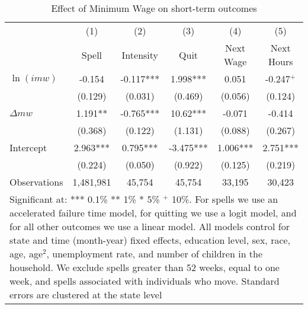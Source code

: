 \documentclass{article}
\begin{document}
\begin{table}
	\centering
	\caption{Effect of Minimum Wage on short-term outcomes}
	{
		\begin{tabular}{lccccc}
			&      (1) &  (2) &    (3) & (4)&(5)\\
			&      Spell &  Intensity &       Quit &  Next Wage & Next Hours \\
			\hline
			\hline
			$\ln(imw)$ &     -0.154 &  -0.117*** &   1.998*** &     0.051 &     -0.247$^+$ \\
			
			&    (0.129) &    (0.031) &    (0.469) &    (0.056) &    (0.124) \\
			
			$\Delta mw$ &    1.191** &  -0.765*** &   10.62*** &    -0.071 &     -0.414 \\
			
			&    (0.368) &    (0.122) &    (1.131) &    (0.088) &    (0.267) \\
			
			Intercept &   2.963*** &   0.795*** &  -3.475*** &   1.006*** &   2.751*** \\
			
			&    (0.224) &     (0.050) &    (0.922) &    (0.125) &    (0.219) \\\hdashline
			
			Observations &    1,481,981 &      45,754 &      45,754 &      33,195 &      30,423 \\
			\hline
			\multicolumn{6}{p{.8\textwidth}}{{\footnotesize Significant at: *** 0.1\% ** 1\% * 5\% $^+$ 10\%. For spells we use an accelerated failure time model, for quitting we use a logit model, and for all other outcomes we use a linear model. All models control for state and time (month-year) fixed effects, education level, sex, race, age, age$^2$, unemployment rate, and number of children in the household. We exclude spells greater than 52 weeks, equal to one week, and spells associated with individuals who move. Standard errors are clustered at the state level }}\\
		\end{tabular}
	}
	\label{tab:overall}
\end{table}
\end{document}
